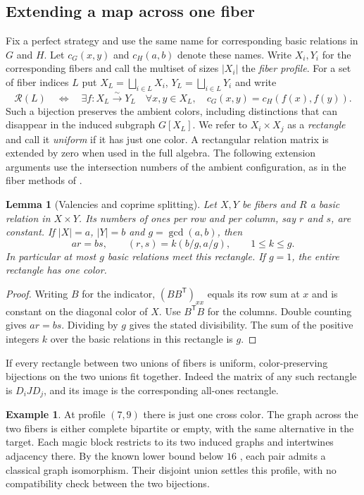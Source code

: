 \documentclass[11pt,reqno]{amsart}
\numberwithin{equation}{section}
\newtheorem{lemma}[theorem]{Lemma}
\theoremstyle{definition}
\newtheorem{example}[theorem]{Example}
\begin{document}
\subsection{Extending a map across one fiber}
Fix a perfect strategy and use the same name for corresponding basic relations in $G$ and $H$. Let $c_G(x,y)$ and $c_H(a,b)$ denote these names. Write $X_i,Y_i$ for the corresponding fibers and call the multiset of sizes $|X_i|$ the \emph{fiber profile}. For a set of fiber indices $L$ put $X_L=\bigsqcup_{i\in L}X_i$, $Y_L=\bigsqcup_{i\in L}Y_i$ and write
\[
 \mathcal R(L)\quad\Longleftrightarrow\quad
 \exists f:X_L\overset{\sim}{\longrightarrow}Y_L\quad
 \forall x,y\in X_L,\quad c_G(x,y)=c_H(f(x),f(y)).
\]
Such a bijection preserves the ambient colors, including distinctions that can disappear in the induced subgraph $G[X_L]$. We refer to $X_i\times X_j$ as a \emph{rectangle} and call it \emph{uniform} if it has just one color. A rectangular relation matrix is extended by zero when used in the full algebra. The following extension arguments use the intersection numbers of the ambient configuration, as in the fiber methods of \cite{FKV,SS}.

\begin{lemma}[Valencies and coprime splitting]\label{lem:split}
Let $X,Y$ be fibers and $R$ a basic relation in $X\times Y$. Its numbers of ones per row and per column, say $r$ and $s$, are constant. If $|X|=a$, $|Y|=b$ and $g=\gcd(a,b)$, then
\[
   ar=bs,\qquad (r,s)=k(b/g,a/g),\qquad 1\le k\le g .
\]
In particular at most $g$ basic relations meet this rectangle. If $g=1$, the entire rectangle has one color.
\end{lemma}
\begin{proof}
Writing $B$ for the indicator, $(BB^{\mathsf T})_{xx}$ equals its row sum at $x$ and is constant on the diagonal color of $X$. Use $B^{\mathsf T}B$ for the columns. Double counting gives $ar=bs$. Dividing by $g$ gives the stated divisibility. The sum of the positive integers $k$ over the basic relations in this rectangle is $g$.
\end{proof}
If every rectangle between two unions of fibers is uniform, color-preserving bijections on the two unions fit together. Indeed the matrix of any such rectangle is $D_iJD_j$, and its image is the corresponding all-ones rectangle.

\begin{example}
At profile $(7,9)$ there is just one cross color. The graph across the two fibers is either complete bipartite or empty, with the same alternative in the target. Each magic block restricts to its two induced graphs and intertwines adjacency there. By the known lower bound below $16$ \cite[\S8.5]{Schmidt}, each pair admits a classical graph isomorphism. Their disjoint union settles this profile, with no compatibility check between the two bijections.
\end{example}
\end{document}
